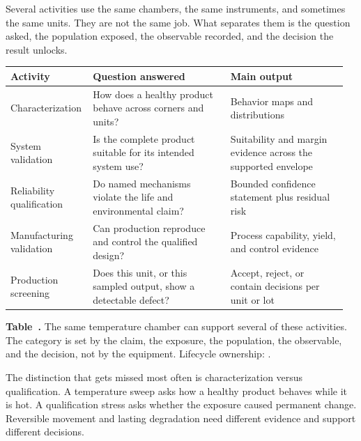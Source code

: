 Several activities use the same chambers, the same instruments, and sometimes
the same units. They are not the same job. What separates them is the question
asked, the population exposed, the observable recorded, and the decision the
result unlocks.

\begin{table}[ht]
\label{tab:qual-activity-split}%
\centering
\setlength{\tabcolsep}{3pt}%
\footnotesize
\renewcommand{\arraystretch}{1.25}%
\begin{tabular}{@{}p{0.22\linewidth}p{0.40\linewidth}p{0.34\linewidth}@{}}
\toprule
Activity & Question answered & Main output \\
\midrule
Characterization & How does a healthy product behave across corners and units? & Behavior maps and distributions \\
\addlinespace[1.0em]
System validation & Is the complete product suitable for its intended system use? & Suitability and margin evidence across the supported envelope \\
\addlinespace[1.0em]
Reliability qualification & Do named mechanisms violate the life and environmental claim? & Bounded confidence statement plus residual risk \\
\addlinespace[1.0em]
Manufacturing validation & Can production reproduce and control the qualified design? & Process capability, yield, and control evidence \\
\addlinespace[1.0em]
Production screening & Does this unit, or this sampled output, show a detectable defect? & Accept, reject, or contain decisions per unit or lot \\
\bottomrule
\end{tabular}
\par\medskip
{\raggedright\footnotesize\textbf{Table~\thetable.} The same temperature
chamber can support several of these activities. The category is set by the
claim, the exposure, the population, the observable, and the decision, not by
the equipment. Lifecycle ownership: .\par}
\end{table}
\FloatBarrier

The distinction that gets missed most often is characterization versus
qualification. A temperature sweep asks how a healthy product behaves while it
is hot. A qualification stress asks whether the exposure caused permanent
change. Reversible movement and lasting degradation need different evidence and
support different decisions.


